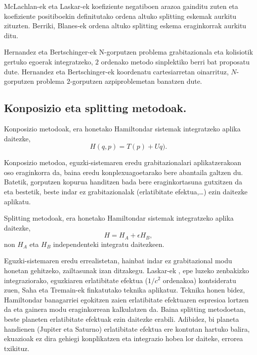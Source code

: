 McLachlan-ek \cite[1995]{McLachlan1995} eta Laskar-ek  \cite[2001]{Laskar2001} koefiziente negatiboen arazoa gainditu zuten eta koefiziente positiboekin definitutako ordena altuko splitting eskemak aurkitu zituzten. Berriki, Blanes-ek \cite[2012]{Blanes2013} ordena altuko splitting eskema  eraginkorrak aurkitu ditu. 

Hernandez eta Bertschinger-ek \cite[2015]{Hernandez2015} N-gorputzen problema grabitazionala eta kolisiotik gertuko egoerak integratzeko, $2$ ordenako metodo sinplektiko berri bat proposatu dute. Hernandez eta Bertschinger-ek \cite{Hernandez2015} koordenatu cartesiarretan oinarrituz, $N$-gorputzen problema $2$-gorputzen azpiproblemetan banatzen dute.


\subsection*{Konposizio eta splitting metodoak.}


Konposizio metodoak, era honetako Hamiltondar sistemak integratzeko aplika daitezke,
\begin{equation*}
H(q,p)=T(p)+Uq).
\end{equation*}

Konposizio metodoa, eguzki-sistemaren eredu grabitazionalari aplikatzerakoan oso eraginkorra da, baina eredu konplexuagoetarako bere abantaila galtzen du. Batetik, gorputzen kopurua handitzen bada bere eraginkortasuna gutxitzen da eta bestetik, beste indar ez grabitazionalak (erlatibitate efektua,\dots) ezin daitezke aplikatu.

Splitting metodoak, era honetako Hamiltondar sistemak integratzeko aplika daitezke, 
\begin{equation}
\label{eq:Hban}
H=H_A+\epsilon H_B,
\end{equation}
non $H_A$ eta $H_B$ independenteki integratu daitezkeen. 

Eguzki-sistemaren eredu errealistetan, hainbat indar ez grabitazional modu honetan gehitzeko, zailtasunak izan ditzakegu.
Laskar-ek \cite[2011]{Laskar2011}, epe luzeko zenbakizko integraziorako,  eguzkiaren erlatibitate efektua ($1/c^2$ ordenakoa)  kontsideratu zuen, Saha eta Tremain-ek \cite{Saha1994} finkatutako teknika aplikatuz. Teknika honen bidez, Hamiltondar banagarriei egokitzen zaien erlatibitate efektuaren espresioa lortzen da eta gainera modu eraginkorrean kalkulatzen da. Baina splitting metodoetan, beste planeten erlatibitate efektuak ezin daitezke erabili. Adibidez, bi planeta handienen (Jupiter eta Saturno) erlatibitate efektua ere kontutan hartuko balira, ekuazioak ez dira gehiegi konplikatzen eta integrazio hobea lor daiteke, errorea txikituz. 
 
